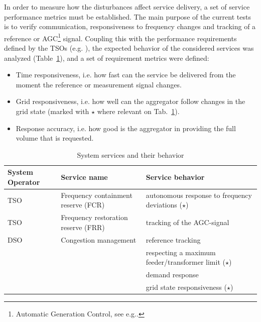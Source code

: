 In order to measure how the disturbances affect service delivery, a set of service performance metrics must be established. The main purpose of the current tests is to verify communication, responsiveness to frequency changes and tracking of a reference or AGC\footnote{Automatic Generation Control, see e.g.\cite{entso1operational}.} signal. Coupling this with the performance requirements defined by the TSOs (e.g. \cite{energinet2012ancillary,ipower2013development}), the expected behavior of the considered services was analyzed (Table~\ref{tab:servmet}), and a set of requirement metrics were defined:
\begin{itemize}
\item Time responsiveness, i.e. how fast can the service be delivered from the moment the reference or measurement signal changes.
\item Grid responsiveness, i.e. how well can the aggregator follow changes in the grid state (marked with $\star$ where relevant on Tab.~\ref{tab:servmet}).
\item Response accuracy, i.e. how good is the aggregator in providing the full volume that is requested.
\end{itemize}


\begin{table}[!t]%
\renewcommand{\arraystretch}{1.30}
\caption{System services and their behavior}
\label{tab:servmet}
\centering
\begin{tabularx}{\columnwidth}{p{1.0cm} X X}
\toprule
System Operator& Service name & Service behavior\\
\midrule
TSO & Frequency containment reserve (FCR) & autonomous response to frequency deviations ($\star$) \\
TSO & Frequency restoration reserve (FRR) & tracking of the AGC-signal\\
DSO & Congestion management         & reference tracking \\
    &                               & respecting a maximum feeder/transformer limit ($\star$) \\
    &                               & demand response \\
    &                               & grid state responsiveness ($\star$)\\
\bottomrule
\end{tabularx}
\end{table}

